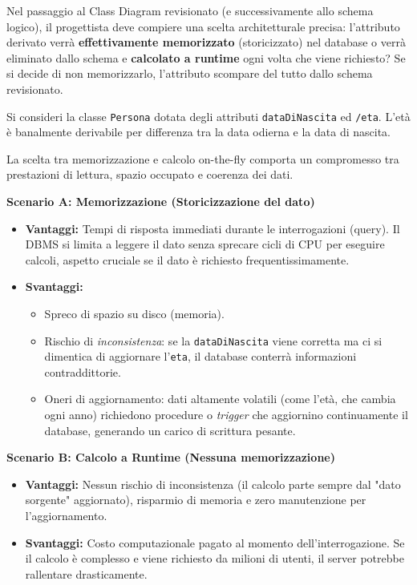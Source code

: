 Nel passaggio al Class Diagram revisionato (e successivamente allo schema logico), il progettista deve compiere una scelta architetturale precisa: l'attributo derivato verrà \textbf{effettivamente memorizzato} (storicizzato) nel database o verrà eliminato dallo schema e \textbf{calcolato a runtime} ogni volta che viene richiesto? Se si decide di non memorizzarlo, l'attributo scompare del tutto dallo schema revisionato.

\begin{example}
Si consideri la classe \texttt{Persona} dotata degli attributi \texttt{dataDiNascita} ed \texttt{/eta}. L'età è banalmente derivabile per differenza tra la data odierna e la data di nascita.
\end{example}

La scelta tra memorizzazione e calcolo on-the-fly comporta un compromesso tra prestazioni di lettura, spazio occupato e coerenza dei dati.

\medskip

\textbf{Scenario A: Memorizzazione (Storicizzazione del dato)}
\begin{itemize}
    \item \textbf{Vantaggi:} Tempi di risposta immediati durante le interrogazioni (query). Il DBMS si limita a leggere il dato senza sprecare cicli di CPU per eseguire calcoli, aspetto cruciale se il dato è richiesto frequentissimamente.
    \item \textbf{Svantaggi:} 
    \begin{itemize}
        \item Spreco di spazio su disco (memoria).
        \item Rischio di \textit{inconsistenza}: se la \texttt{dataDiNascita} viene corretta ma ci si dimentica di aggiornare l'\texttt{eta}, il database conterrà informazioni contraddittorie.
        \item Oneri di aggiornamento: dati altamente volatili (come l'età, che cambia ogni anno) richiedono procedure o \textit{trigger} che aggiornino continuamente il database, generando un carico di scrittura pesante.
    \end{itemize}
\end{itemize}

\medskip

\textbf{Scenario B: Calcolo a Runtime (Nessuna memorizzazione)}
\begin{itemize}
    \item \textbf{Vantaggi:} Nessun rischio di inconsistenza (il calcolo parte sempre dal "dato sorgente" aggiornato), risparmio di memoria e zero manutenzione per l'aggiornamento.
    \item \textbf{Svantaggi:} Costo computazionale pagato al momento dell'interrogazione. Se il calcolo è complesso e viene richiesto da milioni di utenti, il server potrebbe rallentare drasticamente.
\end{itemize}

